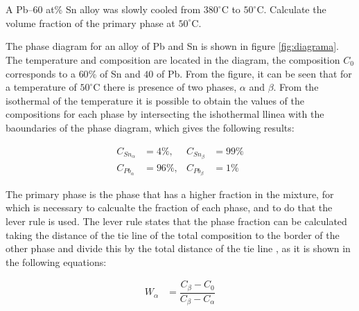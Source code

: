 \section{}

\subsection{}
A Pb–$60$ at\% Sn alloy was slowly cooled from $380^{\circ}$C to $50^{\circ}$C. Calculate the volume fraction of the primary phase at $50^{\circ}$C.

The phase diagram for an alloy of Pb and Sn is shown in figure \ref{fig:diagrama}. The temperature and composition are located in the diagram, the composition $C_0$ corresponds to a $60$\% of Sn and $40$\5 of Pb. From the figure, it can be seen that for a temperature of $50^{\circ}$C there is presence of two phases, $\alpha$ and $\beta$. From the isothermal of the temperature it is possible to obtain the values of the compositions for each phase by intersecting the ishothermal llinea with the baoundaries of the phase diagram, which gives the following results:

\begin{align*}
    C_{Sn}_{\alpha}&=4\%, & C_{Sn}_{\beta}&=99\% \\
    C_{Pb}_{\alpha}&=96\%, & C_{Pb}_{\beta}&=1\%
\end{align*}

The primary phase is the phase that has a higher fraction in the mixture, for which is necessary to calcualte the fraction of each phase, and to do that the lever rule is used. The lever rule states that the phase fraction can be calculated taking the distance of the tie line of the total composition to the border of the other phase and divide this by the total distance of the tie line \citet{callister2010materials}, as it is shown in the following equations:

\begin{align}
    \label{eq:fractions}
    W_{\alpha}&=\dfrac{C_{\beta}-C_0}{C_{\beta}-C_{\alpha}}
\end{align}

